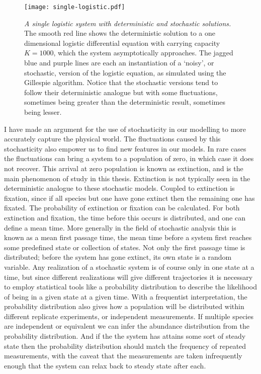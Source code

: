 \begin{figure}[h]
	\centering
	\texttt{[image: single-logistic.pdf]}
	\caption{\emph{A single logistic system with deterministic and stochastic solutions.} The smooth red line shows the deterministic solution to a one dimensional logistic differential equation with carrying capacity $K=1000$, which the system asymptotically approaches. The jagged blue and purple lines are each an instantiation of a `noisy', or stochastic, version of the logistic equation, as simulated using the Gillespie algorithm. Notice that the stochastic versions tend to follow their deterministic analogue but with some fluctuations, sometimes being greater than the deterministic result, sometimes being lesser. }
\end{figure} \label{singlelog}

I have made an argument for the use of stochasticity in our modelling to more accurately capture the physical world. 
The fluctuations caused by this stochasticity also empower us to find new features in our models. 
In rare cases the fluctuations can bring a system to a population of zero, in which case it does not recover. 
This arrival at zero population is known as extinction, and is the main phenomenon of study in this thesis. 
Extinction is not typically seen in the deterministic analogue to these stochastic models. 
Coupled to extinction is fixation, since if all species but one have gone extinct then the remaining one has fixated. 
The probability of extinction or fixation can be calculated. 
For both extinction and fixation, the time before this occurs is distributed, and one can define a mean time. 
More generally in the field of stochastic analysis this is known as a mean first passage time, the mean time before a system first reaches some predefined state or collection of states. 
Not only the first passage time is distributed; before the system has gone extinct, its own state is a random variable. 
Any realization of a stochastic system is of course only in one state at a time, but since different realizations will give different trajectories it is necessary to employ statistical tools like a probability distribution to describe the likelihood of being in a given state at a given time. 
With a frequentist interpretation, the probability distribution also gives how a population will be distributed within different replicate experiments, or independent measurements. 
If multiple species are independent or equivalent we can infer the abundance distribution from the probability distribution. 
And if the the system has attains some sort of steady state then the probability distribution should match the frequency of repeated measurements, with the caveat that the measurements are taken infrequently enough that the system can relax back to steady state after each. 

